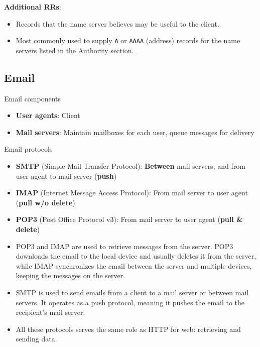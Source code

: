 \begin{knBox}
    \textbf{Additional RRs}:
    \begin{itemize}
        \item Records that the name server believes may be useful to the client.
        \item Most commonly used to supply \texttt{A} or \texttt{AAAA} (address) records for the name servers listed in the Authority section.
    \end{itemize}
\end{knBox}

\subsection{Email}

\begin{knBox}
    {Email components}
    \begin{itemize}
        \item \textbf{User agents}: Client
        \item \textbf{Mail servers}: Maintain mailboxes for each user, queue messages for delivery
    \end{itemize}
\end{knBox}

\begin{definition}
    {Email protocols}

    \begin{itemize}
        \item \textbf{SMTP} (Simple Mail Transfer Protocol): \textbf{Between} mail servers, and from user agent to mail server (\textbf{push})
        \item \textbf{IMAP} (Internet Message Access Protocol): From mail server to user agent (\textbf{pull w/o delete})
        \item \textbf{POP3} (Post Office Protocol v3): From mail server to user agent (\textbf{pull \& delete})
    \end{itemize}

    \begin{itemize}
        \item POP3 and IMAP are used to retrieve messages from the server. POP3 downloads the email to the local device and usually deletes it from the server, while IMAP synchronizes the email between the server and multiple devices, keeping the messages on the server.
        \item SMTP is used to send emails from a client to a mail server or between mail servers. It operates as a push protocol, meaning it pushes the email to the recipient's mail server.
        \item All these protocols serves the same role as HTTP for web: retrieving and sending data.
    \end{itemize}


\end{definition}

